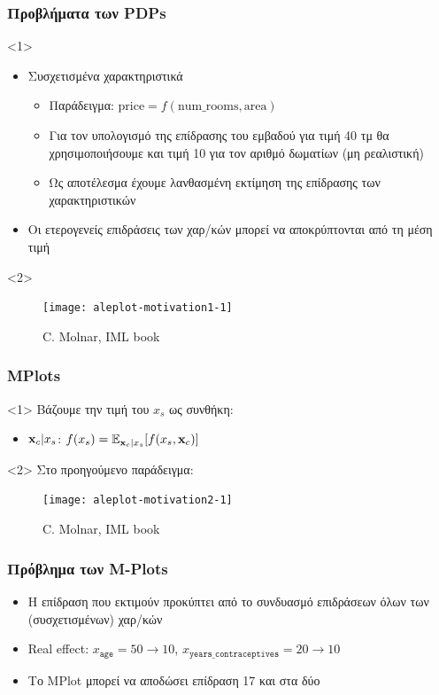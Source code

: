\begin{frame}
  \frametitle{Προβλήματα των PDPs}
  \begin{onlyenv}<1>
    \begin{itemize}
    \item Συσχετισμένα χαρακτηριστικά
      \begin{itemize}
      \item Παράδειγμα: $\text{price} = f(\text{num\_rooms}, \text{area})$
      \item Για τον υπολογισμό της επίδρασης του εμβαδού για τιμή 40 τμ θα χρησιμοποιήσουμε και
        τιμή 10 για τον αριθμό δωματίων (μη ρεαλιστική)
      \item Ως αποτέλεσμα έχουμε λανθασμένη εκτίμηση της επίδρασης των χαρακτηριστικών
      \end{itemize}
    \item Οι ετερογενείς επιδράσεις των χαρ/κών μπορεί να αποκρύπτονται από τη
      μέση τιμή
    \end{itemize}
  \end{onlyenv}
  \begin{onlyenv}<2>
    \begin{figure}
      \texttt{[image: aleplot-motivation1-1]}
      \caption{\footnotesize C. Molnar, IML book}
    \end{figure}
  \end{onlyenv}
\end{frame}

\begin{frame}
  \frametitle{MPlots}

  \begin{onlyenv}<1>
    Βάζουμε την τιμή του $x_s$ ως συνθήκη:
    \begin{itemize}
    \item \(\mathbf{x}_c|x_s\): \(f(x_s) = \mathbb{E}_{\mathbf{x}_c|x_s}[f(x_s, \mathbf{x}_c)]\)
    \end{itemize}
  \end{onlyenv}
  \begin{onlyenv}<2>
    Στο προηγούμενο παράδειγμα:
    \begin{figure}
      \texttt{[image: aleplot-motivation2-1]}
      \caption{\footnotesize C. Molnar, IML book}
    \end{figure}
  \end{onlyenv}
\end{frame}

\begin{frame}
  \frametitle{Πρόβλημα των M-Plots}
  \begin{itemize}
  \item Η επίδραση που εκτιμούν προκύπτει από το συνδυασμό επιδράσεων όλων των
    (συσχετισμένων) χαρ/κών
  \item Real effect: \(x_{\mathtt{age}} = 50 \rightarrow 10\), \(x_{\mathtt{years\_contraceptives}} = 20 \rightarrow 10\)
  \item Το MPlot μπορεί να αποδώσει επίδραση 17 και στα δύο
  \end{itemize}
\end{frame}

